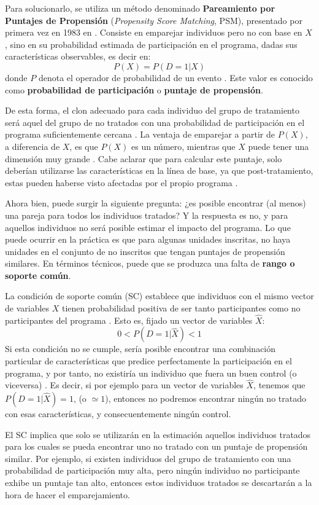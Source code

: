\documentclass[../../main.tex]{subfiles}
\begin{document}
Para solucionarlo, se utiliza un método denominado \textbf{Pareamiento por Puntajes de
Propensión} (\textit{Propensity Score Matching}, PSM), presentado por primera vez en 1983
en \cite{psm1983}. Consiste en emparejar individuos pero no con base en \(X\), sino en su
probabilidad estimada de participación en el programa, dadas sus características
observables, es decir en:
\[P(X) = P(D = 1|X)\] donde \(P\) denota el operador de probabilidad de un evento . Este
valor es conocido como \textbf{probabilidad de participación} o \textbf{puntaje de
propensión}.

De esta forma, el clon adecuado para cada individuo del grupo de tratamiento
será aquel del grupo de no tratados con una probabilidad de participación en el programa
suficientemente cercana \cite{bernal}. La ventaja de emparejar a partir de \(P(X)\), a
diferencia de \(X\), es que \(P(X)\) es un número, mientras que \(X\) puede tener una
dimensión muy grande \cite{bernal}. Cabe aclarar que para calcular este puntaje, solo
deberían utilizarse las características en la línea de base, ya que post-tratamiento,
estas pueden haberse visto afectadas por el propio programa \cite{gertler-2016}.

Ahora bien, puede surgir la siguiente pregunta: ¿es posible encontrar (al menos) una pareja
para todos los individuos tratados? Y la respuesta es no, y para aquellos individuos no
será posible estimar el impacto del programa. Lo que puede ocurrir en la práctica es que
para algunas unidades inscritas, no haya unidades en el conjunto de no inscritos que
tengan puntajes de propensión similares. En términos técnicos, puede que se produzca una
falta de \textbf{rango o soporte común}.

La condición de soporte común (SC) establece que individuos con el mismo vector de
variables \(X\) tienen probabilidad positiva de ser tanto participantes como no
participantes del programa \cite{bernal}. Esto es, fijado un vector de variables
\(\hat{X}\):
\[0 < P(D=1|\hat{X}) < 1\] Si esta condición no se cumple, sería posible encontrar una
combinación particular de características que predice perfectamente la participación en el
programa, y por tanto, no existiría un individuo que fuera un buen control (o viceversa)
\cite{bernal}. Es decir, si por ejemplo para un vector de variables \(\hat{X}\), tenemos
que \(P(D=1|\hat{X})=1\), (o \(\simeq 1\)), entonces no podremos encontrar ningún no
tratado con esas características, y consecuentemente ningún control.

El SC implica que solo se utilizarán en la estimación aquellos individuos tratados para
los cuales se pueda encontrar uno no tratado con un puntaje de propensión similar. Por
ejemplo, si existen individuos del grupo de tratamiento con una probabilidad de
participación muy alta, pero ningún individuo no participante exhibe un puntaje tan alto,
entonces estos individuos tratados se descartarán a la hora de hacer el emparejamiento.
\end{document}
